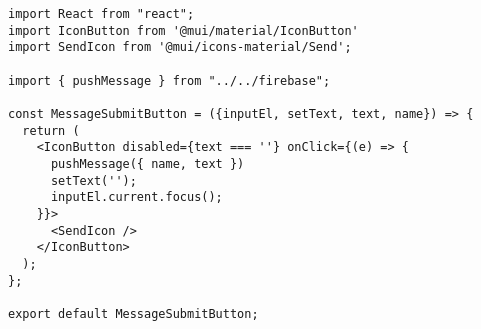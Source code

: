 \begin{verbatim}
import React from "react";
import IconButton from '@mui/material/IconButton'
import SendIcon from '@mui/icons-material/Send';

import { pushMessage } from "../../firebase";

const MessageSubmitButton = ({inputEl, setText, text, name}) => {
  return (
    <IconButton disabled={text === ''} onClick={(e) => {
      pushMessage({ name, text })
      setText('');
      inputEl.current.focus();
    }}>
      <SendIcon />
    </IconButton>
  );
};

export default MessageSubmitButton;
\end{verbatim}